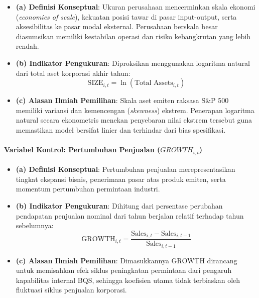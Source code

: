 \documentclass[12pt,a4paper]{article}
\providecommand{\tightlist}{%
  \setlength{\itemsep}{0pt}\setlength{\parskip}{0pt}%
}
\begin{document}
\begin{itemize}
\tightlist
\item
  \textbf{(a) Definisi Konseptual}: Ukuran perusahaan mencerminkan skala
  ekonomi (\emph{economies of scale}), kekuatan posisi tawar di pasar
  input-output, serta aksesibilitas ke pasar modal eksternal. Perusahaan
  berskala besar diasumsikan memiliki kestabilan operasi dan risiko
  kebangkrutan yang lebih rendah.
\item
  \textbf{(b) Indikator Pengukuran}: Diproksikan menggunakan logaritma
  natural dari total aset korporasi akhir tahun: \begin{equation}
  \mathrm{SIZE}_{i,t} = \ln(\text{Total Assets}_{i,t})
  \end{equation}
\item
  \textbf{(c) Alasan Ilmiah Pemilihan}: Skala aset emiten raksasa S\&P
  500 memiliki variansi dan kemencengan (\emph{skewness}) ekstrem.
  Penerapan logaritma natural secara ekonometris menekan penyebaran
  nilai ekstrem tersebut guna memastikan model bersifat linier dan
  terhindar dari bias spesifikasi.
\end{itemize}

\paragraph{\texorpdfstring{Variabel Kontrol: Pertumbuhan Penjualan
(\(GROWTH_{i,t}\))}{Variabel Kontrol: Pertumbuhan Penjualan (GROWTH\_\{i,t\})}}\label{variabel-kontrol-pertumbuhan-penjualan-growth_it}

\begin{itemize}
\tightlist
\item
  \textbf{(a) Definisi Konseptual}: Pertumbuhan penjualan
  merepresentasikan tingkat ekspansi bisnis, penerimaan pasar atas
  produk emiten, serta momentum pertumbuhan permintaan industri.
\item
  \textbf{(b) Indikator Pengukuran}: Dihitung dari persentase perubahan
  pendapatan penjualan nominal dari tahun berjalan relatif terhadap
  tahun sebelumnya: \begin{equation}
  \mathrm{GROWTH}_{i,t} = \frac{\text{Sales}_{i,t} - \text{Sales}_{i,t-1}}{\text{Sales}_{i,t-1}}
  \end{equation}
\item
  \textbf{(c) Alasan Ilmiah Pemilihan}: Dimasukkannya GROWTH dirancang
  untuk memisahkan efek siklus peningkatan permintaan dari pengaruh
  kapabilitas internal BQS, sehingga koefisien utama tidak terbiaskan
  oleh fluktuasi siklus penjualan korporasi.
\end{itemize}
\end{document}

